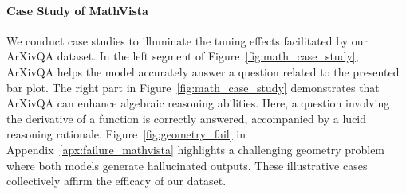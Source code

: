 

\paragraph{Case Study of MathVista}
We conduct case studies to illuminate the tuning effects facilitated by our ArXivQA dataset. In the left segment of Figure~\ref{fig:math_case_study}, ArXivQA helps the model accurately answer a question related to the presented bar plot. 
The right part in Figure~\ref{fig:math_case_study} demonstrates that ArXivQA can enhance algebraic reasoning abilities. Here, a question involving the derivative of a function is correctly answered, accompanied by a lucid reasoning rationale.
Figure~\ref{fig:geometry_fail} in Appendix~\ref{apx:failure_mathvista} highlights a challenging geometry problem where both models generate hallucinated outputs. 
These illustrative cases collectively affirm the efficacy of our dataset.


